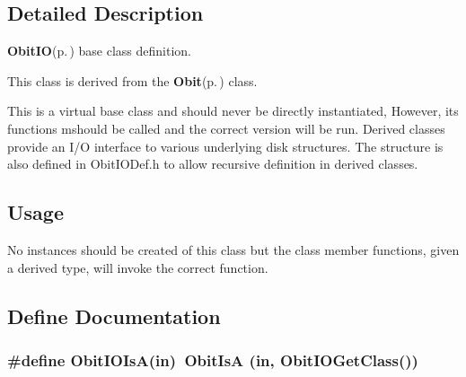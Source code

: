 

\subsection{Detailed Description}
{\bf Obit\-IO}{\rm (p.\,\pageref{structObitIO})} base class definition. 

This class is derived from the {\bf Obit}{\rm (p.\,\pageref{structObit})} class.

This is a virtual base class and should never be directly instantiated, However, its functions mshould be called and the correct version will be run. Derived classes provide an I/O interface to various underlying disk structures. The structure is also defined in Obit\-IODef.h to allow recursive definition in derived classes.\subsection{Usage}\label{ObitIO_8h_ObitIOUsage}
No instances should be created of this class but the class member functions, given a derived type, will invoke the correct function.

\subsection{Define Documentation}
\subsubsection{\setlength{\rightskip}{0pt plus 5cm}\#define Obit\-IOIs\-A(in)\ Obit\-Is\-A (in, Obit\-IOGet\-Class())}\label{ObitIO_8h_a2}


